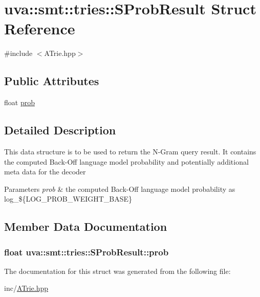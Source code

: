 \hypertarget{structuva_1_1smt_1_1tries_1_1_s_prob_result}{}\section{uva\+:\+:smt\+:\+:tries\+:\+:S\+Prob\+Result Struct Reference}
\label{structuva_1_1smt_1_1tries_1_1_s_prob_result}


{\ttfamily \#include $<$A\+Trie.\+hpp$>$}

\subsection*{Public Attributes}
\begin{DoxyCompactItemize}
\item 
float \hyperlink{structuva_1_1smt_1_1tries_1_1_s_prob_result_ab3ee325486a4178241c94f0f1f113f2e}{prob}
\end{DoxyCompactItemize}


\subsection{Detailed Description}
This data structure is to be used to return the N-\/\+Gram query result. It contains the computed Back-\/\+Off language model probability and potentially additional meta data for the decoder 
\begin{DoxyParams}{Parameters}
{\em prob} & the computed Back-\/\+Off language model probability as log\+\_\+\$\{L\+O\+G\+\_\+\+P\+R\+O\+B\+\_\+\+W\+E\+I\+G\+H\+T\+\_\+\+B\+A\+S\+E\} \\
\hline
\end{DoxyParams}


\subsection{Member Data Documentation}
\hypertarget{structuva_1_1smt_1_1tries_1_1_s_prob_result_ab3ee325486a4178241c94f0f1f113f2e}{}
\subsubsection[{prob}]{\setlength{\rightskip}{0pt plus 5cm}float uva\+::smt\+::tries\+::\+S\+Prob\+Result\+::prob}\label{structuva_1_1smt_1_1tries_1_1_s_prob_result_ab3ee325486a4178241c94f0f1f113f2e}


The documentation for this struct was generated from the following file\+:\begin{DoxyCompactItemize}
\item 
inc/\hyperlink{_a_trie_8hpp}{A\+Trie.\+hpp}\end{DoxyCompactItemize}
